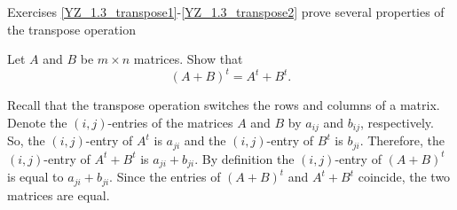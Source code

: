 \documentclass{ximera}
\begin{document}
Exercises \ref{YZ_1.3_transpose1}-\ref{YZ_1.3_transpose2} prove several properties of the transpose operation
\begin{exercise} \label{YZ_1.3_transpose1}
Let $A$ and $B$ be $m\times n$ matrices. Show that 
\begin{equation} \label{at+bt}
(A+B)^t=A^t+B^t.
\end{equation}
\begin{solution}
\soln Recall that the transpose operation switches the rows and columns of a matrix. Denote the $(i,j)$-entries of the matrices $A$ and $B$ by $a_{ij}$ and $b_{ij}$, respectively. So, the $(i,j)$-entry of $A^t$ is $a_{ji}$ and the $(i,j)$-entry of $B^t$ is $b_{ji}$. Therefore, the $(i,j)$-entry of $A^t+B^t$ is $a_{ji}+b_{ji}$. By definition the $(i,j)$-entry of $(A+B)^t$ is equal to $a_{ji}+b_{ji}$. Since the entries of $(A+B)^t$ and $A^t+B^t$ coincide, the two matrices are equal.
\end{solution}
\end{exercise}
\end{document}
